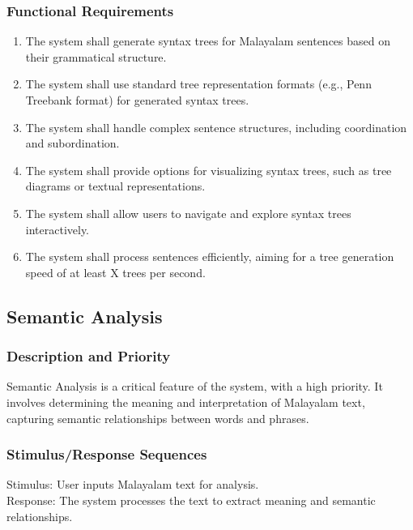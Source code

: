 \documentclass[12pt]{article}
\begin{document}
	\subsubsection{Functional Requirements}
	\begin{enumerate}
		\item The system shall generate syntax trees for Malayalam sentences based on their
		grammatical structure.
		\item The system shall use standard tree representation formats (e.g., Penn Treebank
		format) for generated syntax trees.
		\item The system shall handle complex sentence structures, including coordination and
		subordination.
		\item The system shall provide options for visualizing syntax trees, such as tree
		diagrams or textual representations.
		\item The system shall allow users to navigate and explore syntax trees interactively.
		\item The system shall process sentences efficiently, aiming for a tree generation speed
		of at least X trees per second.
	\end{enumerate}

	\subsection{Semantic Analysis}
	
	\subsubsection{Description and Priority}
	Semantic Analysis is a critical feature of the system, with a high priority. It involves
	determining the meaning and interpretation of Malayalam text, capturing semantic
	relationships between words and phrases.
	
	\subsubsection{Stimulus/Response Sequences}
	Stimulus: User inputs Malayalam text for analysis.\\
	Response: The system processes the text to extract meaning and semantic relationships.
	
\end{document}
